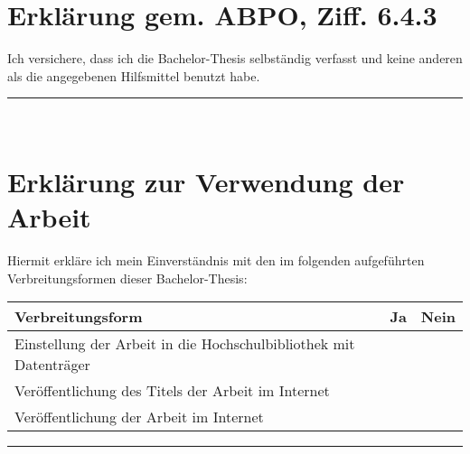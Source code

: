 \section*{Erklärung gem. ABPO, Ziff. 6.4.3}

Ich versichere, dass ich die Bachelor-Thesis selbständig verfasst und keine anderen als die
angegebenen Hilfsmittel benutzt habe.

\vspace{3cm}
\makebox[.45\linewidth][l]{\thecity, \thedate}\hfill\rule{.45\linewidth}{0.5pt}\\
\makebox[.45\linewidth][l]{}\hfill\makebox[.45\linewidth][l]{\theauthor}

\vfill

\section*{Erklärung zur Verwendung der Arbeit}

Hiermit erkläre ich mein Einverständnis mit den im folgenden aufgeführten Verbreitungsformen dieser
Bachelor-Thesis:

\begin{tabularx}{\linewidth}{|R|c|c|}
	\hline
	\textbf{Verbreitungsform} & \textbf{Ja} & \textbf{Nein}
	\\\hline
	Einstellung der Arbeit in die Hochschulbibliothek mit Datenträger &  & 
	\\\hline
	Veröffentlichung des Titels der Arbeit im Internet &  & 
	\\\hline
	Veröffentlichung der Arbeit im Internet &  & 
	\\\hline
\end{tabularx}

\vspace{3cm}
\makebox[.45\linewidth][l]{\thecity, \thedate}\hfill\rule{.45\linewidth}{0.5pt}\\
\makebox[.45\linewidth][l]{}\hfill\makebox[.45\linewidth][l]{\theauthor}
